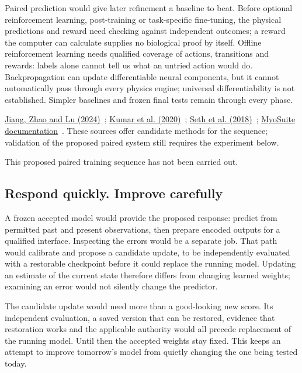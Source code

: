 Paired prediction would give later refinement a baseline to beat. Before
optional reinforcement learning, post-training or task-specific fine-tuning,
the physical predictions and reward need checking against independent
outcomes; a reward the computer can calculate supplies no biological proof
by itself. Offline reinforcement learning needs qualified coverage of actions,
transitions and rewards: labels alone cannot tell us what an untried action
would do. Backpropagation can update differentiable neural components, but
it cannot automatically pass through every physics engine; universal
differentiability is not established. Simpler baselines and frozen final
tests remain through every phase.
\par\noindent \href{https://arxiv.org/html/2405.18765v1}{Jiang, Zhao and Lu (2024)}~\cite{labram2024}; \href{https://arxiv.org/abs/2006.04779v3}{Kumar et al. (2020)}~\cite{cql2020}; \href{https://journals.plos.org/ploscompbiol/article?id=10.1371/journal.pcbi.1006223}{Seth et al. (2018)}~\cite{opensim2018}; \href{https://myosuite.readthedocs.io/en/latest/}{MyoSuite documentation}~\cite{myosuiteDocsUndated}. These sources offer candidate methods for the sequence; validation of the proposed paired system still requires the experiment below.

This proposed paired training sequence has not been carried out.

\subsection{Respond quickly. Improve carefully}
A frozen accepted model would provide the proposed response: predict from
permitted past and present observations, then prepare encoded outputs for a
qualified interface. Inspecting the errors would be a separate job. That path
would calibrate and propose a candidate update, to be independently evaluated
with a restorable checkpoint before it could replace the running model.
Updating an estimate of the current state therefore differs from changing
learned weights; examining an error would not silently change the predictor.

The candidate update would need more than a good-looking new score. Its
independent evaluation, a saved version that can be restored, evidence that
restoration works and the applicable authority would all precede replacement
of the running model. Until then the accepted weights stay fixed. This keeps
an attempt to improve tomorrow's model from quietly changing the one being
tested today.

